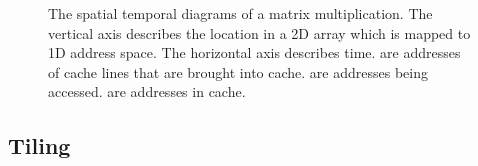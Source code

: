 \begin{figure}[!h]
{
        \label{fig:st_matrix_column}
    }

    \caption{
        The spatial temporal diagrams of a matrix multiplication. The vertical axis describes the location in a 2D array which is mapped to 1D address space. The horizontal axis describes time.  are addresses of cache lines that are brought into cache.  are addresses being accessed.  are addresses in cache.
    }
    \label{fig:st_matrix}
\end{figure}

\subsection{Tiling}
